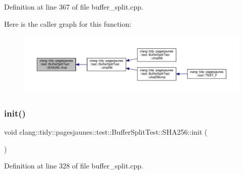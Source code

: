 Definition at line 367 of file buffer\+\_\+split.\+cpp.

Here is the caller graph for this function\+:
\nopagebreak
\begin{figure}[H]
\begin{center}
\leavevmode
\includegraphics[width=350pt]{classclang_1_1tidy_1_1pagesjaunes_1_1test_1_1_buffer_split_test_1_1_s_h_a256_a2b08353f629a883cba24db56131354ba_icgraph}
\end{center}
\end{figure}
\mbox{\label{classclang_1_1tidy_1_1pagesjaunes_1_1test_1_1_buffer_split_test_1_1_s_h_a256_a675218f3f34cc88eaf81668db0c507e9}} 
\subsubsection{\texorpdfstring{init()}{init()}}
{\footnotesize\ttfamily void clang\+::tidy\+::pagesjaunes\+::test\+::\+Buffer\+Split\+Test\+::\+S\+H\+A256\+::init (\begin{DoxyParamCaption}{ }\end{DoxyParamCaption})}



Definition at line 328 of file buffer\+\_\+split.\+cpp.

